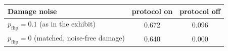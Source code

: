 \begin{tabular}{@{}lcc@{}}
\toprule
Damage noise & protocol on & protocol off \\
\midrule
$p_{\mathrm{flip}}=0.1$ (as in the exhibit) & 0.672 & 0.096 \\
$p_{\mathrm{flip}}=0$ (matched, noise-free damage) & 0.640 & 0.000 \\
\bottomrule
\end{tabular}
